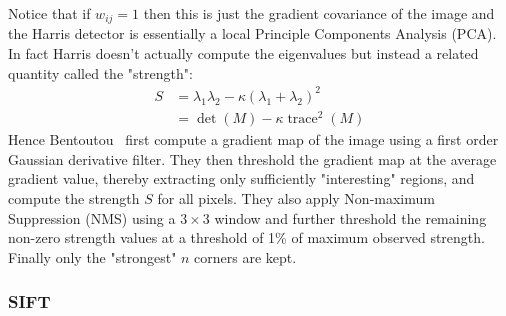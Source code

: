 Notice that if \(w_{ij} = 1\) then this is just the gradient covariance of the image and the Harris detector is essentially a local Principle Components Analysis (PCA).
%
In fact Harris doesn't actually compute the eigenvalues but instead a related quantity called the "strength":
\begin{align}
	S & = \lambda_1 \lambda_2 - \kappa (\lambda_1 + \lambda_2)^2 \\
	  & = \det(M) - \kappa \operatorname{trace}^2(M)
	\label{eqn:strength}
\end{align}
%
Hence Bentoutou \etal~first compute a gradient map of the image using a first order Gaussian derivative filter.
%
They then threshold the gradient map at the average gradient value, thereby extracting only sufficiently "interesting" regions, and compute the strength \(S\) for all pixels.
%
They also apply Non-maximum Suppression (NMS) using a \(3 \times 3\) window and further threshold the remaining non-zero strength values at a threshold of 1\% of maximum observed strength.
%
Finally only the "strongest" \(n\) corners are kept.

\subsubsection{SIFT}\label{sec:sift}

